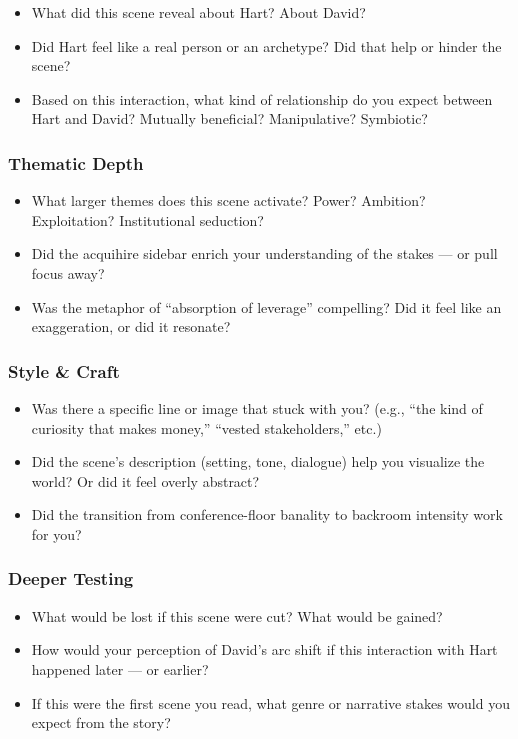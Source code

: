 \begin{itemize}
  \item What did this scene reveal about Hart? About David?
  \item Did Hart feel like a real person or an archetype? Did that help or hinder the scene?
  \item Based on this interaction, what kind of relationship do you expect between Hart and David? Mutually beneficial? Manipulative? Symbiotic?
\end{itemize}

\subsubsection*{Thematic Depth}

\begin{itemize}
  \item What larger themes does this scene activate? Power? Ambition? Exploitation? Institutional seduction?
  \item Did the acquihire sidebar enrich your understanding of the stakes — or pull focus away?
  \item Was the metaphor of “absorption of leverage” compelling? Did it feel like an exaggeration, or did it resonate?
\end{itemize}

\subsubsection*{Style \& Craft}

\begin{itemize}
  \item Was there a specific line or image that stuck with you? (e.g., “the kind of curiosity that makes money,” “vested stakeholders,” etc.)
  \item Did the scene’s description (setting, tone, dialogue) help you visualize the world? Or did it feel overly abstract?
  \item Did the transition from conference-floor banality to backroom intensity work for you?
\end{itemize}

\subsubsection*{Deeper Testing}

\begin{itemize}
  \item What would be lost if this scene were cut? What would be gained?
  \item How would your perception of David’s arc shift if this interaction with Hart happened later — or earlier?
  \item If this were the first scene you read, what genre or narrative stakes would you expect from the story?
\end{itemize}

